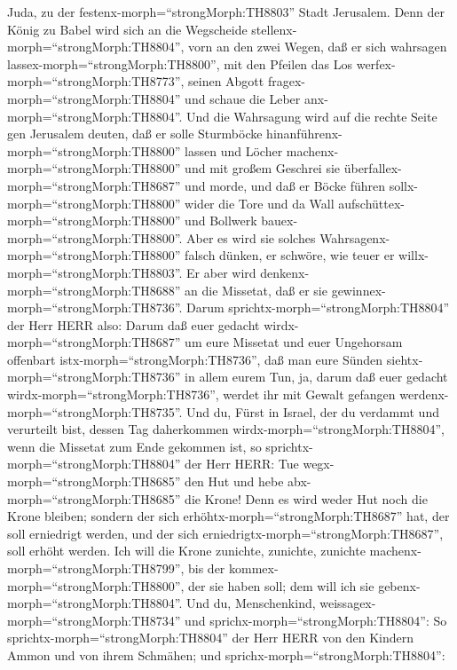 Juda, zu der festenx-morph=``strongMorph:TH8803'' Stadt Jerusalem.
 Denn der König zu Babel wird sich an die Wegscheide
stellenx-morph=``strongMorph:TH8804'', vorn an den zwei Wegen, daß er
sich wahrsagen lassex-morph=``strongMorph:TH8800'', mit den Pfeilen das
Los werfex-morph=``strongMorph:TH8773'', seinen Abgott
fragex-morph=``strongMorph:TH8804'' und schaue die Leber
anx-morph=``strongMorph:TH8804''.  Und die Wahrsagung wird
auf die rechte Seite gen Jerusalem deuten, daß er solle Sturmböcke
hinanführenx-morph=``strongMorph:TH8800'' lassen und Löcher
machenx-morph=``strongMorph:TH8800'' und mit großem Geschrei sie
überfallex-morph=``strongMorph:TH8687'' und morde, und daß er Böcke
führen sollx-morph=``strongMorph:TH8800'' wider die Tore und da Wall
aufschüttex-morph=``strongMorph:TH8800'' und Bollwerk
bauex-morph=``strongMorph:TH8800''.  Aber es wird sie
solches Wahrsagenx-morph=``strongMorph:TH8800'' falsch dünken, er
schwöre, wie teuer er willx-morph=``strongMorph:TH8803''. Er aber wird
denkenx-morph=``strongMorph:TH8688'' an die Missetat, daß er sie
gewinnex-morph=``strongMorph:TH8736''.  Darum
sprichtx-morph=``strongMorph:TH8804'' der Herr HERR also: Darum daß euer
gedacht wirdx-morph=``strongMorph:TH8687'' um eure Missetat und euer
Ungehorsam offenbart istx-morph=``strongMorph:TH8736'', daß man eure
Sünden siehtx-morph=``strongMorph:TH8736'' in allem eurem Tun, ja, darum
daß euer gedacht wirdx-morph=``strongMorph:TH8736'', werdet ihr mit
Gewalt gefangen werdenx-morph=``strongMorph:TH8735''.  Und
du, Fürst in Israel, der du verdammt und verurteilt bist, dessen Tag
daherkommen wirdx-morph=``strongMorph:TH8804'', wenn die Missetat zum
Ende gekommen ist,  so
sprichtx-morph=``strongMorph:TH8804'' der Herr HERR: Tue
wegx-morph=``strongMorph:TH8685'' den Hut und hebe
abx-morph=``strongMorph:TH8685'' die Krone! Denn es wird weder Hut noch
die Krone bleiben; sondern der sich erhöhtx-morph=``strongMorph:TH8687''
hat, der soll erniedrigt werden, und der sich
erniedrigtx-morph=``strongMorph:TH8687'', soll erhöht werden.
 Ich will die Krone zunichte, zunichte, zunichte
machenx-morph=``strongMorph:TH8799'', bis der
kommex-morph=``strongMorph:TH8800'', der sie haben soll; dem will ich
sie gebenx-morph=``strongMorph:TH8804''.  Und du,
Menschenkind, weissagex-morph=``strongMorph:TH8734'' und
sprichx-morph=``strongMorph:TH8804'': So
sprichtx-morph=``strongMorph:TH8804'' der Herr HERR von den Kindern
Ammon und von ihrem Schmähen; und sprichx-morph=``strongMorph:TH8804'':
